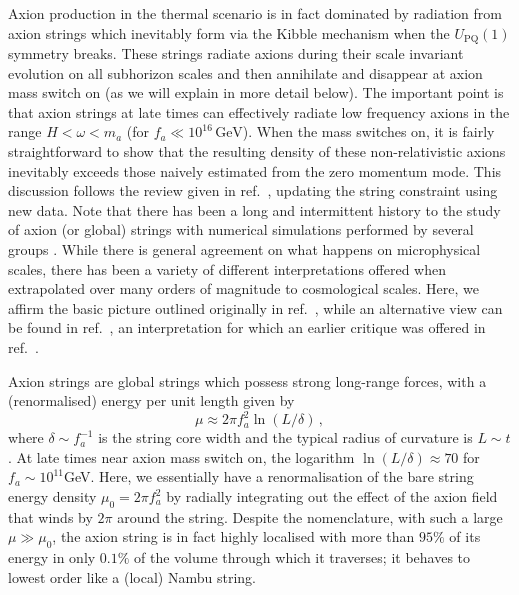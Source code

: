 \documentclass[preprint,nofootinbib]{revtex4}
\newcommand{\units}[1]{\, \mathrm{#1}}
\begin{document}
Axion production in the thermal scenario is in fact dominated by radiation from axion strings which inevitably form via the Kibble mechanism \cite{kibble:mechanism} when the $U_{\mathrm{PQ}}(1)$ symmetry breaks. These strings radiate axions during their scale invariant evolution on all subhorizon scales and then annihilate and disappear at axion mass switch on (as we will explain in more detail below). The important point is that axion strings at late times can effectively radiate low frequency axions in the range $H < \omega < m_a$ (for $f_a \ll 10^{16} \units{GeV}$). When the mass switches on, it is fairly straightforward to show that the resulting density of these non-relativistic axions inevitably exceeds those naively estimated from the zero momentum mode. This discussion follows the review given in ref.~\cite{battye:shellard:axion:string:1994b,battye:shellard:axion:string:1994b:error,Battye:1997jk}, updating the string constraint using new data. Note that there has been a long and intermittent history to the study of axion (or global) strings with numerical simulations performed by several groups \cite{battye:shellard:axion:string:1994b,hagmann:chang:sikivie:axion:string,moore:shellard:martins:abelian:higgs:string:network,yamaguchi:yokoyama:global:strings:lagrangian}. While there is general agreement on what happens on microphysical scales, there has been a variety of different interpretations offered when extrapolated over many orders of magnitude to cosmological scales. Here, we affirm the basic picture outlined originally in ref.~\cite{Vilenkin:1982ks}, while an alternative view can be found in ref.~\cite{Sikivie:2006ni}, an interpretation for which an earlier critique was offered in ref.~\cite{Battye:1997jk}.

Axion strings are global strings which possess strong long-range forces, with a (renormalised) energy per unit length given by
\begin{equation}
\mu \approx 2\pi f_a^2 \ln (L/\delta)\,,
\end{equation}
where $\delta \sim f_a^{-1}$ is the string core width and the typical radius of curvature is $L\sim t$.   At late times near axion mass switch on, the logarithm $\ln (L/\delta)\approx 70$ for $f_a \sim 10^{11}$GeV. Here, we essentially have a renormalisation of the bare string energy density $\mu_0 = 2\pi f_a^2$ by radially integrating out the effect of the axion field that winds by $2\pi$ around the string. Despite the nomenclature, with such a large $\mu \gg \mu_0$, the axion string is in fact highly localised with more than $95\%$ of its energy in only $0.1\%$ of the volume through which it traverses; it behaves to lowest order like a (local) Nambu string.
\end{document}
